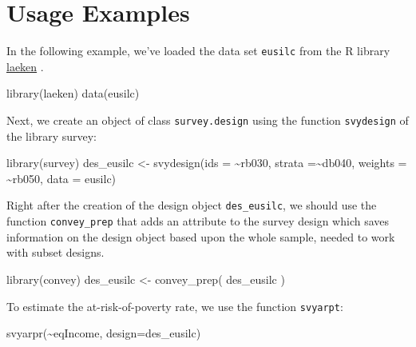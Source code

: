 \documentclass[
]{book}
\newenvironment{Shaded}{\begin{snugshade}}{\end{snugshade}}
\newcommand{\AttributeTok}[1]{\textcolor[rgb]{0.77,0.63,0.00}{#1}}
\newcommand{\FunctionTok}[1]{\textcolor[rgb]{0.00,0.00,0.00}{#1}}
\newcommand{\NormalTok}[1]{#1}
\newcommand{\OtherTok}[1]{\textcolor[rgb]{0.56,0.35,0.01}{#1}}
\newcommand{\SpecialCharTok}[1]{\textcolor[rgb]{0.00,0.00,0.00}{#1}}
\begin{document}
\hypertarget{usage-examples}{%
\section{Usage Examples}\label{usage-examples}}

In the following example, we've loaded the data set \texttt{eusilc} from the R library \href{https://CRAN.R-project.org/package=laeken}{laeken} \autocite{R-laeken}.

\begin{Shaded}
\begin{Highlighting}[]
\FunctionTok{library}\NormalTok{(laeken)}
\FunctionTok{data}\NormalTok{(eusilc)}
\end{Highlighting}
\end{Shaded}

Next, we create an object of class \texttt{survey.design} using the function \texttt{svydesign} of the library survey:

\begin{Shaded}
\begin{Highlighting}[]
\FunctionTok{library}\NormalTok{(survey)}
\NormalTok{des\_eusilc }\OtherTok{\textless{}{-}} \FunctionTok{svydesign}\NormalTok{(}\AttributeTok{ids =} \SpecialCharTok{\textasciitilde{}}\NormalTok{rb030, }\AttributeTok{strata =}\SpecialCharTok{\textasciitilde{}}\NormalTok{db040,  }\AttributeTok{weights =} \SpecialCharTok{\textasciitilde{}}\NormalTok{rb050, }\AttributeTok{data =}\NormalTok{ eusilc)}
\end{Highlighting}
\end{Shaded}

Right after the creation of the design object \texttt{des\_eusilc}, we should use the function \texttt{convey\_prep} that adds an attribute to the survey design which saves information on the design object based upon the whole sample, needed to work with subset designs.

\begin{Shaded}
\begin{Highlighting}[]
\FunctionTok{library}\NormalTok{(convey)}
\NormalTok{des\_eusilc }\OtherTok{\textless{}{-}} \FunctionTok{convey\_prep}\NormalTok{( des\_eusilc )}
\end{Highlighting}
\end{Shaded}

To estimate the at-risk-of-poverty rate, we use the function \texttt{svyarpt}:

\begin{Shaded}
\begin{Highlighting}[]
\FunctionTok{svyarpr}\NormalTok{(}\SpecialCharTok{\textasciitilde{}}\NormalTok{eqIncome, }\AttributeTok{design=}\NormalTok{des\_eusilc)}
\end{Highlighting}
\end{Shaded}
\end{document}
